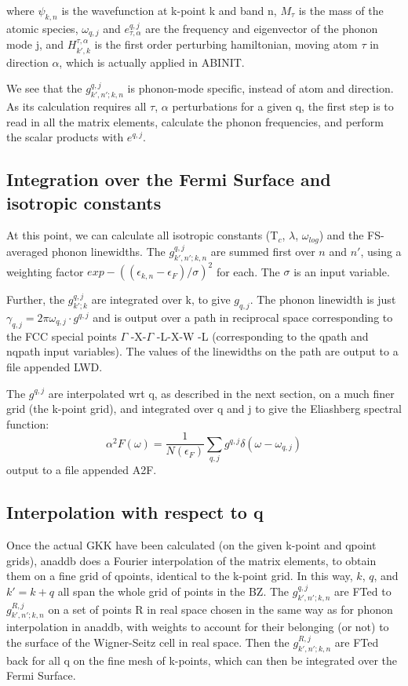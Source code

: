 \documentclass[aps,preprint]{revtex4-1}
\begin{document}
where $\psi_{k,n}$ is the wavefunction at k-point k and band n, $M_\tau$ is the
mass of the atomic species, $\omega_{q,j}$ and ${e}^{q,j}_{\tau, \alpha}$
are the frequency and eigenvector of the phonon mode j, and $H^{\tau,
\alpha}_{k',k}$ is the first order perturbing hamiltonian, moving atom $\tau$
in direction $\alpha$, which is actually applied in ABINIT.

We see that the $g^{q,j}_{k',n';k,n}$ is phonon-mode specific, instead of atom and
direction. As its calculation requires all $\tau$, $\alpha$ perturbations for a given q,
the first step is to read in all the matrix elements, calculate the phonon
frequencies, and perform the scalar products with ${e}^{q,j}$.

\subsection{Integration over the Fermi Surface and isotropic constants}
At this point, we can calculate all isotropic constants (T$_c$, $\lambda$,
$\omega_{log}$) and the FS-averaged phonon linewidths. The
$g^{q,j}_{k',n';k,n}$ are summed first over $n$ and $n'$, using a weighting factor
$exp -((\epsilon_{k,n} - \epsilon_F )/\sigma)^2$ for each. The $\sigma$ is an input variable.

Further, the $g^{q,j}_{k';k}$ are integrated over k, to give $g_{q,j}$. The
phonon linewidth is just $\gamma_{q,j} = 2 \pi \omega_{q,j} \cdot g^{q,j}$ and
is output over a path in reciprocal space corresponding to the FCC special
points $\Gamma$ -X-$\Gamma$ -L-X-W -L (corresponding to the qpath and nqpath
input variables). The values of the linewidths on the path are output to a file
appended LWD.

The $g^{q,j}$ are interpolated wrt q, as described in the next section, on a much
finer grid (the k-point grid), and integrated over q and j to give the
Eliashberg spectral function:
\begin{equation}
\alpha^2 F(\omega) = \frac{1}{N(\epsilon_F)} \sum_{q,j} g^{q,j} \delta(\omega - \omega_{q,j})
\end{equation}
output to a file appended A2F.

\subsection{Interpolation with respect to q}
Once the actual GKK have been calculated (on the given k-point and qpoint
grids), anaddb does a Fourier interpolation of the matrix elements, to obtain
them on a fine grid of qpoints, identical to the k-point grid. In this way, $k$,
$q$, and $k' = k + q$ all span the whole grid of points in the BZ. The
$g^{q,j}_{k',n';k,n}$ are FTed to $g^{R,j}_{k',n';k,n}$ on a set of points R in real space
chosen in the same way as for phonon interpolation in anaddb, with weights to
account for their belonging (or not) to the surface of the Wigner-Seitz cell in
real space. Then the $g^{R,j}_{k',n';k,n}$ are FTed back for all q on the fine mesh of
k-points, which can then be integrated over the Fermi Surface.
\end{document}
